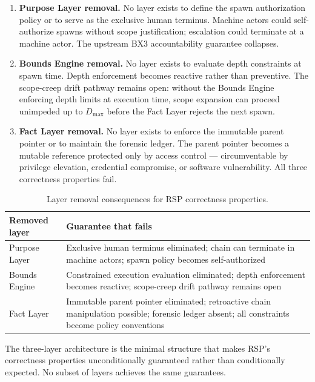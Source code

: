 \begin{enumerate}
    \item[(i)] \textbf{Purpose Layer removal.} No layer exists to define the spawn authorization policy or to serve as the exclusive human terminus. Machine actors could self-authorize spawns without scope justification; escalation could terminate at a machine actor. The upstream BX3 accountability guarantee collapses.
    \item[(ii)] \textbf{Bounds Engine removal.} No layer exists to evaluate depth constraints at spawn time. Depth enforcement becomes reactive rather than preventive. The scope-creep drift pathway remains open: without the Bounds Engine enforcing depth limits at execution time, scope expansion can proceed unimpeded up to $D_{\mathrm{max}}$ before the Fact Layer rejects the next spawn.
    \item[(iii)] \textbf{Fact Layer removal.} No layer exists to enforce the immutable parent pointer or to maintain the forensic ledger. The parent pointer becomes a mutable reference protected only by access control — circumventable by privilege elevation, credential compromise, or software vulnerability. All three correctness properties fail.
\end{enumerate}

\begin{table}[h]
\centering
\begin{tabular}{p{3.2cm} p{4.8cm}}
\toprule
\textbf{Removed layer} & \textbf{Guarantee that fails} \\
\midrule
Purpose Layer & Exclusive human terminus eliminated; chain can terminate in machine actors; spawn policy becomes self-authorized \\
Bounds Engine & Constrained execution evaluation eliminated; depth enforcement becomes reactive; scope-creep drift pathway remains open \\
Fact Layer & Immutable parent pointer eliminated; retroactive chain manipulation possible; forensic ledger absent; all constraints become policy conventions \\
\bottomrule
\end{tabular}
\caption{Layer removal consequences for RSP correctness properties.}
\label{tab:layer-minimality}
\end{table}

The three-layer architecture is the minimal structure that makes RSP's correctness properties unconditionally guaranteed rather than conditionally expected. No subset of layers achieves the same guarantees.

